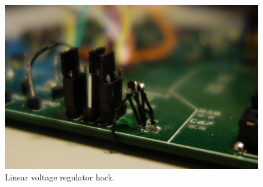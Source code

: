 \begin{figure}[H]
    \centering
    \includegraphics[scale=0.1]{figures/results/pcb/linear-regulator.jpg}
    \caption{Linear voltage regulator hack.}
    \label{fig:res:linreg}
\end{figure}
